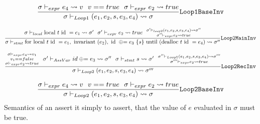 \begin{equation} \label{eq:loop1BaseInv}
    \frac{\sigma \vdash_{expr} e_4 \leadsto v ~~
        v == true ~~
        \sigma \vdash_{expr} e_2 \leadsto true}
    {\sigma \vdash_{Loop1} (e_1, e_2, s, e_3, e_4) \leadsto \sigma}
    \text{\texttt{Loop1BaseInv}}
\end{equation}

\begin{equation} \label{eq:loop2MainInv}
    \frac{\sigma \vdash_{local} \text{local } t \text{ id } = e_1 \leadsto \sigma' ~~
        \sigma' \vdash_{expr} e_2 \leadsto true ~~
        \substack{\sigma' \vdash_{loop2} (e_1, e_2, s, e_3, e_4) \leadsto \sigma'' \\
            \sigma'' \vdash_{expr} e_2 \leadsto true}}
    {\sigma \vdash_{stmt} \text{for local }t\text{ id }= e_1, \text{ invariant }(e_2), \text{ id }\oplus{\kern-5.0pt}= e_3 ~\{s\} \text{ until (dealloc } t\text{ id }= e_4) \leadsto \sigma''}
    \text{\texttt{Loop2MainInv}}
\end{equation}


\begin{equation} \label{eq:loop2RecInv}
    \frac{\substack{\sigma \vdash_{expr} e_4 \leadsto v_1 \\
            v_1 == false \\
            \sigma \vdash_{expr} e_2 \leadsto true} ~~
        \sigma' \vdash_{AssVar} id \oplus{\kern-5.0pt}= e_3 \leadsto \sigma'' ~~
        \sigma \vdash_{stmt} s \leadsto \sigma' ~~
        \substack{\sigma'' \vdash_{Loop1} (e_1, e_2, s, e_3, e_4) \leadsto \sigma''' \\
            \sigma''' \vdash_{expr} e_2 \leadsto true}}
    {\sigma \vdash_{Loop2} (e_1, e_2, s, e_3, e_4) \leadsto \sigma'''}
    \text{\texttt{Loop2RecInv}}
\end{equation}

\begin{equation} \label{eq:loop2BaseInv}
    \frac{\sigma \vdash_{expr} e_4 \leadsto v ~~
        v == true ~~
        \sigma \vdash_{expr} e_2 \leadsto true}
    {\sigma \vdash_{Loop2} (e_1, e_2, s, e_3, e_4) \leadsto \sigma}
    \text{\texttt{Loop2BaseInv}}
\end{equation}
\noindent
Semantics of an assert it simply to assert, that the value of $e$ evaluated in $\sigma$ must
be true.


